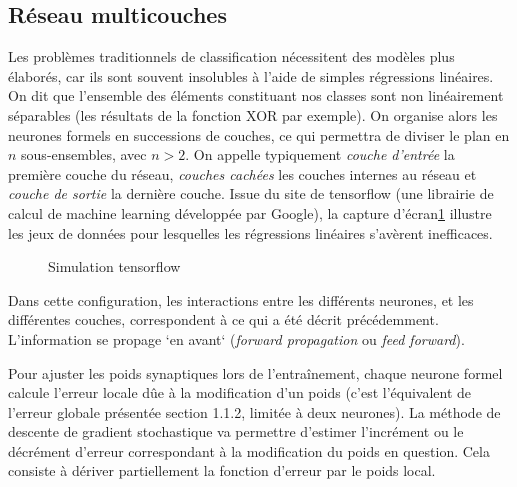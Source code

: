    \subsection{Réseau multicouches}

      Les problèmes traditionnels de classification nécessitent des modèles plus élaborés, car ils sont souvent insolubles à l'aide de simples régressions linéaires. On dit que l'ensemble des éléments constituant nos classes
      sont non linéairement séparables (les résultats de la fonction XOR par exemple). On organise alors les neurones formels en successions de couches, ce qui permettra de diviser le plan en $n$ sous-ensembles, avec $n >2$.
      On appelle typiquement \textit{couche d'entrée} la première couche du réseau, \textit{couches cachées} les couches internes au réseau et \textit{couche de sortie} la dernière couche.
      Issue du site de tensorflow\cite{Bib_PlaygroundTF} (une librairie de calcul de machine learning développée par Google\cite{Bib_TenFlo}), la capture d'écran\ref{fig:c1p2s2} illustre les jeux de données pour lesquelles les régressions linéaires s'avèrent inefficaces.

      \begin{figure}[H]
	  \centering
	  \caption{Simulation tensorflow}
	  \label{fig:c1p2s2}
      \end{figure}


      Dans cette configuration, les interactions entre les différents neurones, et les différentes couches, correspondent à ce qui a été décrit précédemment. L'information se propage `en avant` (\textit{forward propagation} ou \textit{feed forward}).
      \par
      Pour ajuster les poids synaptiques lors de l'entraînement, chaque neurone formel calcule l'erreur locale dûe à la modification d'un poids (c'est l'équivalent de l'erreur globale présentée section 1.1.2, limitée à deux neurones).
      La méthode de descente de gradient stochastique\cite{Bib_WikiSGD} va permettre d'estimer l'incrément ou le décrément d'erreur correspondant à la modification du poids en question. Cela consiste à dériver partiellement la fonction d'erreur par le poids local.

